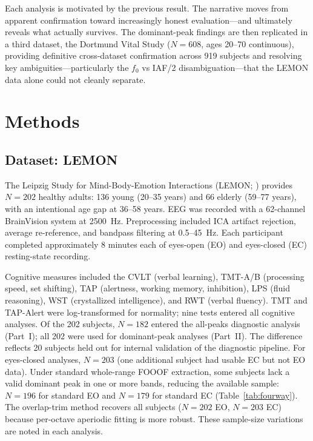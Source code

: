 \documentclass[11pt,a4paper]{article}
\newcommand{\fzero}{f_0}
\begin{document}
Each analysis is motivated by the previous result. The narrative moves from apparent confirmation toward increasingly honest evaluation---and ultimately reveals what actually survives. The dominant-peak findings are then replicated in a third dataset, the Dortmund Vital Study ($N = 608$, ages 20--70 continuous), providing definitive cross-dataset confirmation across 919 subjects and resolving key ambiguities---particularly the $\fzero$ vs IAF/2 disambiguation---that the LEMON data alone could not cleanly separate.

\section{Methods}

\subsection{Dataset: LEMON}

The Leipzig Study for Mind-Body-Emotion Interactions (LEMON; \cite{Babayan2019}) provides $N = 202$ healthy adults: 136 young (20--35 years) and 66 elderly (59--77 years), with an intentional age gap at 36--58 years. EEG was recorded with a 62-channel BrainVision system at 2500~Hz. Preprocessing included ICA artifact rejection, average re-reference, and bandpass filtering at 0.5--45~Hz. Each participant completed approximately 8 minutes each of eyes-open (EO) and eyes-closed (EC) resting-state recording.

Cognitive measures included the CVLT (verbal learning), TMT-A/B (processing speed, set shifting), TAP (alertness, working memory, inhibition), LPS (fluid reasoning), WST (crystallized intelligence), and RWT (verbal fluency). TMT and TAP-Alert were log-transformed for normality; nine tests entered all cognitive analyses. Of the 202 subjects, $N = 182$ entered the all-peaks diagnostic analysis (Part~I); all 202 were used for dominant-peak analyses (Part~II). The difference reflects 20 subjects held out for internal validation of the diagnostic pipeline. For eyes-closed analyses, $N = 203$ (one additional subject had usable EC but not EO data). Under standard whole-range FOOOF extraction, some subjects lack a valid dominant peak in one or more bands, reducing the available sample: $N = 196$ for standard EO and $N = 179$ for standard EC (Table~\ref{tab:fourway}). The overlap-trim method recovers all subjects ($N = 202$ EO, $N = 203$ EC) because per-octave aperiodic fitting is more robust. These sample-size variations are noted in each analysis.
\end{document}
